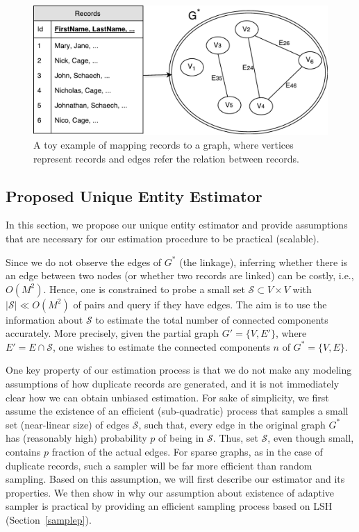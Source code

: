 \documentclass[aoas]{imsart}
\begin{document}
\begin{figure}[ht]
	\begin{center}
		\includegraphics[width=\linewidth]{fig/map.pdf}
		\caption{A toy example of mapping records to a graph, where vertices represent records and edges refer the relation between records.}
		\label{map}
	\end{center}
	\vskip -0.2in
\end{figure}


\subsection{Proposed Unique Entity Estimator}
\label{analysis}
In this section, we propose our unique entity estimator and provide assumptions that are necessary for our estimation procedure to be practical (scalable).

Since we do not observe the edges of $G^*$ (the linkage), inferring whether there is an edge between two nodes (or whether two records are linked) can be costly, i.e., $O(M^2)$. Hence, one is constrained to probe a small set $\mathcal{S} \subset V \times V$ with $|\mathcal{S}|\ll O(M^2)$ of pairs and query if they have edges. The aim is to use the information about $\mathcal{S}$ to estimate the total number of connected components accurately. More precisely,  given the partial graph $G' = \{V,E'\}$, where $E' = E \cap \mathcal{S}$, one wishes to estimate the connected components $n$ of $G^* = \{V,E\}.$


One key property of our estimation process is that we do not make any modeling assumptions of how duplicate records are generated, and it is not immediately clear how we can obtain unbiased estimation. For sake of simplicity, we first assume the existence of an efficient (sub-quadratic) process that samples a small set (near-linear size) of edges $\mathcal{S}$, such that, every edge in the original graph $G^*$ has (reasonably high) probability $p$ of being in $\mathcal{S}$. Thus, set $\mathcal{S}$, even though small, contains $p$ fraction of the actual edges. For sparse graphs, as in the case of duplicate records, such a sampler will be far more efficient than random sampling. Based on this assumption, we will first describe our estimator and its properties. We then show in why our assumption about existence of adaptive sampler is practical by providing an efficient sampling process based on LSH (Section~\ref{samplep}).
\end{document}
